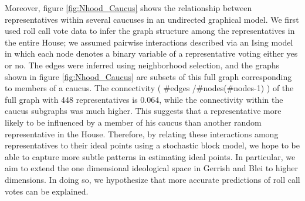 \documentclass{article}
\begin{document}
Moreover, figure \ref{fig:Nhood_Caucus} shows the relationship between representatives within several caucuses in an undirected graphical model. We first used roll call vote data to infer the graph structure among the representatives in the entire House; we assumed pairwise interactions described via an Ising model in which each node denotes a binary variable of a representative voting either yes or no. The edges were inferred using neighborhood selection, and the graphs shown in figure \ref{fig:Nhood_Caucus} are subsets of this full graph corresponding to members of a caucus. The connectivity ( \#edges /\#nodes(\#nodes-1) ) of the full graph with 448 representatives is 0.064, while the connectivity within the caucus subgraphs was much higher. This suggests that a representative more likely to be influenced by a member of his caucus than another  random representative in the House. Therefore, by relating these interactions among representatives to their ideal points using a stochastic block model, we hope to be able to capture more subtle patterns in estimating ideal points. In particular, we aim to extend the one dimensional ideological space in Gerrish and Blei to higher dimensions. In doing so, we hypothesize that more accurate predictions of roll call votes can be explained. 



\end{document}
